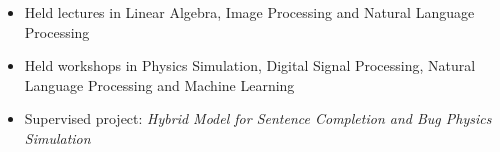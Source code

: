 \documentclass[10pt,a4paper]{source/altacv}
\begin{document}
\divider



\begin{itemize}
    \item   \small{Held lectures in Linear Algebra, Image Processing and Natural Language Processing}
    \item   \small{Held workshops in Physics Simulation, Digital Signal Processing, Natural Language Processing and Machine Learning}
    \item   \small{Supervised project: \textit{Hybrid Model for Sentence Completion and Bug Physics Simulation}}
    \\
    \smallskip
    \smallskip
       
\end{itemize}

\medskip





\end{document}
